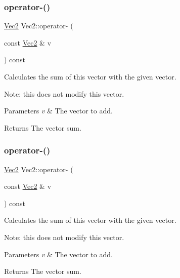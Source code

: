 \subsubsection{\texorpdfstring{operator-\/()}{operator-()}\hspace{0.1cm}{\footnotesize\ttfamily [1/4]}}
{\footnotesize\ttfamily \hyperlink{classVec2}{Vec2} Vec2\+::operator-\/ (\begin{DoxyParamCaption}\item[{const \hyperlink{classVec2}{Vec2} \&}]{v }\end{DoxyParamCaption}) const\hspace{0.3cm}{\ttfamily [inline]}}

Calculates the sum of this vector with the given vector.

Note\+: this does not modify this vector.


\begin{DoxyParams}{Parameters}
{\em v} & The vector to add. \\
\hline
\end{DoxyParams}
\begin{DoxyReturn}{Returns}
The vector sum. 
\end{DoxyReturn}
\mbox{\label{classVec2_afea5a75f39e0db3d893aa56f11e90a60}} 
\subsubsection{\texorpdfstring{operator-\/()}{operator-()}\hspace{0.1cm}{\footnotesize\ttfamily [2/4]}}
{\footnotesize\ttfamily \hyperlink{classVec2}{Vec2} Vec2\+::operator-\/ (\begin{DoxyParamCaption}\item[{const \hyperlink{classVec2}{Vec2} \&}]{v }\end{DoxyParamCaption}) const\hspace{0.3cm}{\ttfamily [inline]}}

Calculates the sum of this vector with the given vector.

Note\+: this does not modify this vector.


\begin{DoxyParams}{Parameters}
{\em v} & The vector to add. \\
\hline
\end{DoxyParams}
\begin{DoxyReturn}{Returns}
The vector sum. 
\end{DoxyReturn}
\mbox{\label{classVec2_ae96b9fc7ac393b36eae80d141d9f8819}} 
